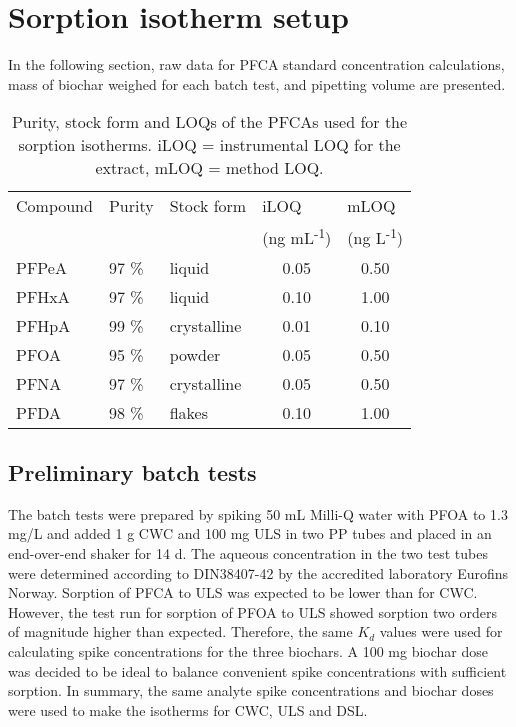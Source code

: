 \chapter{Sorption isotherm setup}\label{appSec:IsothermSetup}
In the following section, raw data for PFCA standard concentration calculations, mass of biochar weighed for each batch test, and pipetting volume are presented.

\begin{table}
    \centering
    \caption{Purity, stock form and LOQs of the PFCAs used for the sorption isotherms. iLOQ = instrumental LOQ for  the extract, mLOQ = method LOQ.}
    \label{apptab:LOQ}
    \begin{tabular}{@{}lllcc@{}}
    \toprule
    \multicolumn{1}{l}{Compound}  & \multicolumn{1}{l}{Purity}  & \multicolumn{1}{l}{Stock form} & \multicolumn{1}{l}{iLOQ} & \multicolumn{1}{l}{mLOQ}  \\ 
    & & & \multicolumn{1}{l}{(ng mL\textsuperscript{-1})}  & \multicolumn{1}{l}{(ng L\textsuperscript{-1})} \\ \midrule
     PFPeA  & 97 \%   & liquid      & 0.05 & 0.50   \\
     PFHxA  & 97 \%   & liquid      & 0.10 & 1.00   \\
     PFHpA  & 99 \%   & crystalline & 0.01 & 0.10   \\
     PFOA   & 95 \%   & powder      & 0.05 & 0.50   \\
     PFNA   & 97 \%   & crystalline & 0.05 & 0.50   \\
     PFDA   & 98 \%   & flakes      & 0.10 & 1.00   \\ \bottomrule
    \end{tabular}
\end{table}

\section{Preliminary batch tests}
The batch tests were prepared by spiking 50 mL Milli-Q water with PFOA to 1.3 mg/L and added 1 g CWC and 100 mg ULS in two PP tubes and placed in an end-over-end shaker for 14 d. The aqueous concentration in the two test tubes were determined according to DIN38407-42 by the accredited laboratory Eurofins Norway. Sorption of PFCA to ULS was expected to be lower than for CWC. However, the test run for sorption of PFOA to ULS showed sorption two orders of magnitude higher than expected. Therefore, the same $K_d$ values were used for calculating spike concentrations for the three biochars. A 100 mg biochar dose was decided to be ideal to balance convenient spike concentrations with sufficient sorption. In summary, the same analyte spike concentrations and biochar doses were used to make the isotherms for CWC, ULS and DSL.

